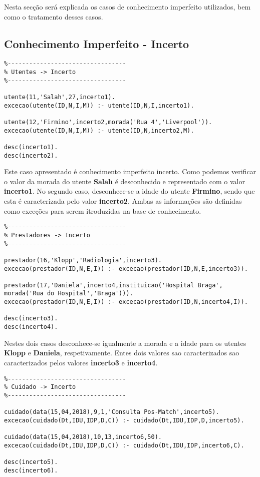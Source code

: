 \documentclass{report}
\begin{document}
Nesta secção será explicada os casos de conhecimento imperfeito utilizados, bem como o tratamento desses casos.

\subsection{Conhecimento Imperfeito - Incerto}

\begin{verbatim}
%---------------------------------
% Utentes -> Incerto
%---------------------------------

utente(11,'Salah',27,incerto1).
excecao(utente(ID,N,I,M)) :- utente(ID,N,I,incerto1).

utente(12,'Firmino',incerto2,morada('Rua 4','Liverpool')).
excecao(utente(ID,N,I,M)) :- utente(ID,N,incerto2,M).

desc(incerto1).
desc(incerto2).
\end{verbatim}

Este caso apresentado é conhecimento imperfeito incerto. Como podemos verificar o valor da morada do utente \textbf{Salah} é desconhecido e representado com o valor \textbf{incerto1}.
No segundo caso, desconhece-se a idade do utente \textbf{Firmino}, sendo que esta é caracterizada pelo valor \textbf{incerto2}.
Ambas as informações são definidas como exceções para serem itroduzidas na base de conhecimento.

\begin{verbatim}
%---------------------------------
% Prestadores -> Incerto
%---------------------------------

prestador(16,'Klopp','Radiologia',incerto3).
excecao(prestador(ID,N,E,I)) :- excecao(prestador(ID,N,E,incerto3)).

prestador(17,'Daniela',incerto4,instituicao('Hospital Braga', morada('Rua do Hospital','Braga'))).
excecao(prestador(ID,N,E,I)) :- excecao(prestador(ID,N,incerto4,I)).

desc(incerto3).
desc(incerto4).
\end{verbatim}

Nestes dois casos desconhece-se igualmente a morada e a idade para os utentes \textbf{Klopp} e \textbf{Daniela}, respetivamente. Entes dois valores sao caracterizados sao caracterizados pelos valores \textbf{incerto3} e \textbf{incerto4}.

\begin{verbatim}
%---------------------------------
% Cuidado -> Incerto
%---------------------------------

cuidado(data(15,04,2018),9,1,'Consulta Pos-Match',incerto5).
excecao(cuidado(Dt,IDU,IDP,D,C)) :- cuidado(Dt,IDU,IDP,D,incerto5).

cuidado(data(15,04,2018),10,13,incerto6,50).
excecao(cuidado(Dt,IDU,IDP,D,C)) :- cuidado(Dt,IDU,IDP,incerto6,C).

desc(incerto5).
desc(incerto6).
\end{verbatim}
\end{document}
